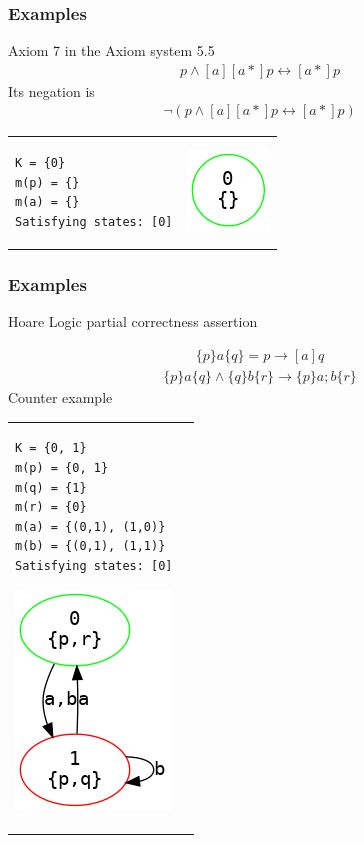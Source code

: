 \documentclass{beamer}
\begin{document}
\begin{frame}[fragile]
\frametitle{Examples}
Axiom 7 in the Axiom system 5.5
\begin{align*}
p \wedge [a][a*] p \leftrightarrow [a*]p
\end{align*}
Its negation is
\begin{align*}
\neg (p \wedge [a][a*] p \leftrightarrow [a*]p)
\end{align*}
\small
\begin{tabular}{ll} 
\begin{lstlisting} 
K = {0}
m(p) = {}
m(a) = {}
Satisfying states: [0]
\end{lstlisting} &
\includegraphics[scale=0.3]{axiom7.png}
\end{tabular}
\end{frame}

\begin{frame}[fragile]
\frametitle{Examples}
Hoare Logic partial correctness assertion

\begin{align*}
\lbrace p \rbrace a \lbrace q \rbrace = p \rightarrow [a] q
\end{align*}
\begin{align*}
\lbrace p \rbrace a \lbrace q \rbrace \wedge  \lbrace q \rbrace b \lbrace r \rbrace
\rightarrow
\lbrace p \rbrace a;b \lbrace r \rbrace
\end{align*}
Counter example
\small
\begin{tabular}{ll} 
\begin{lstlisting} 
K = {0, 1}
m(p) = {0, 1}
m(q) = {1}
m(r) = {0}
m(a) = {(0,1), (1,0)}
m(b) = {(0,1), (1,1)}
Satisfying states: [0]
\end{lstlisting} 
\includegraphics[scale=0.3]{hoare1.png}
\end{tabular}
\end{frame}
\end{document}
